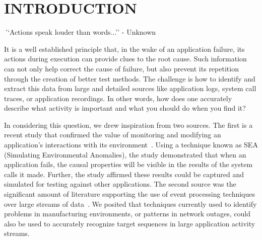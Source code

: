 \section{\uppercase{Introduction}}
\label{sec:introduction}


{\textit ``Actions speak louder than words...'' - Unknown}


It is a well established principle
that, in the wake of an application failure,
its actions
during execution can provide clues
to the root cause.
Such information
can not only help correct
the cause of failure,
but also prevent its repetition through the creation
of better test methods.
The challenge is 
how to identify and extract this data
from large and detailed sources like application logs,
system call traces,
or application recordings.
In other words, how does one
accurately describe what activity is important
and what you should do when you find it?

In considering this question,  we drew inspiration from two sources. The
first is a recent study that confirmed the value of monitoring and
modifying an application’s  interactions with its environment~\cite{DBLP:conf/issre/MooreCFW19}.  Using a technique known as SEA (Simulating Environmental Anomalies), the study demonstrated that when an application fails, the causal properties
will be visible in the results of the system calls it made. Further, the study affirmed these results could
be captured and simulated for testing against other applications.  The
second source was the significant amount of literature supporting the use of event
processing techniques over large streams of data~\cite{DBLP:conf/sigmod/AgrawalDGI08,DBLP:conf/debs/Hirzel12,DBLP:journals/ibmrd/HirzelAGJKKMNSSW13,DBLP:journals/csur/DayarathnaP18}. We posited that techniques
currently used to identify problems in  manufacturing environments, or patterns in
network outages, could also be used to accurately recognize target
sequences in large
application activity streams.

